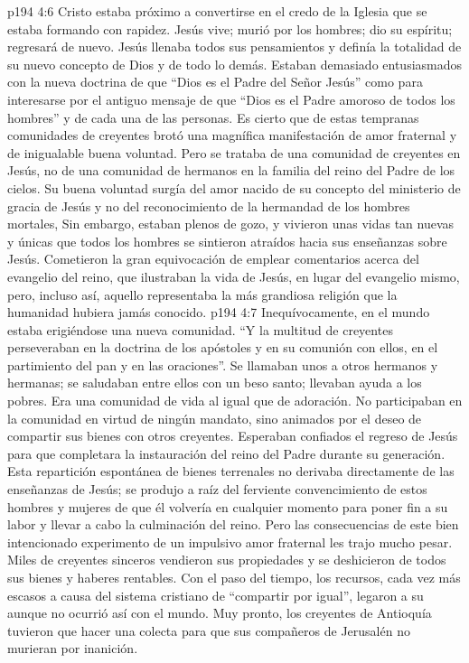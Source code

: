 \vs p194 4:6 Cristo estaba próximo a convertirse en el credo de la Iglesia que se estaba formando con rapidez. Jesús vive; murió por los hombres; dio su espíritu; regresará de nuevo. Jesús llenaba todos sus pensamientos y definía la totalidad de su nuevo concepto de Dios y de todo lo demás. Estaban demasiado entusiasmados con la nueva doctrina de que “Dios es el Padre del Señor Jesús” como para interesarse por el antiguo mensaje de que “Dios es el Padre amoroso de todos los hombres” y de cada una de las personas. Es cierto que de estas tempranas comunidades de creyentes brotó una magnífica manifestación de amor fraternal y de inigualable buena voluntad. Pero se trataba de una comunidad de creyentes en Jesús, no de una comunidad de hermanos en la familia del reino del Padre de los cielos. Su buena voluntad surgía del amor nacido de su concepto del ministerio de gracia de Jesús y no del reconocimiento de la hermandad de los hombres mortales, Sin embargo, estaban plenos de gozo, y vivieron unas vidas tan nuevas y únicas que todos los hombres se sintieron atraídos hacia sus enseñanzas sobre Jesús. Cometieron la gran equivocación de emplear comentarios acerca del evangelio del reino, que ilustraban la vida de Jesús, en lugar del evangelio mismo, pero, incluso así, aquello representaba la más grandiosa religión que la humanidad hubiera jamás conocido.
\vs p194 4:7 Inequívocamente, en el mundo estaba erigiéndose una nueva comunidad. “Y la multitud de creyentes perseveraban en la doctrina de los apóstoles y en su comunión con ellos, en el partimiento del pan y en las oraciones”. Se llamaban unos a otros hermanos y hermanas; se saludaban entre ellos con un beso santo; llevaban ayuda a los pobres. Era una comunidad de vida al igual que de adoración. No participaban en la comunidad en virtud de ningún mandato, sino animados por el deseo de compartir sus bienes con otros creyentes. Esperaban confiados el regreso de Jesús para que completara la instauración del reino del Padre durante su generación. Esta repartición espontánea de bienes terrenales no derivaba directamente de las enseñanzas de Jesús; se produjo a raíz del ferviente convencimiento de estos hombres y mujeres de que él volvería en cualquier momento para poner fin a su labor y llevar a cabo la culminación del reino. Pero las consecuencias de este bien intencionado experimento de un impulsivo amor fraternal les trajo mucho pesar. Miles de creyentes sinceros vendieron sus propiedades y se deshicieron de todos sus bienes y haberes rentables. Con el paso del tiempo, los recursos, cada vez más escasos a causa del sistema cristiano de “compartir por igual”, legaron a su  aunque no ocurrió así con el mundo. Muy pronto, los creyentes de Antioquía tuvieron que hacer una colecta para que sus compañeros de Jerusalén no murieran por inanición.

